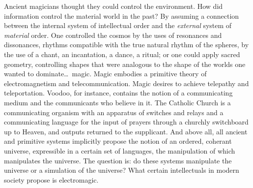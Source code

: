 Ancient magicians thought they could control the environment. How did information control the
material world in the past? By assuming a connection between the internal system of intellectual
order and the \emph{external} system of \emph{material} order. One controlled the cosmos by the uses
of resonances and dissonances, rhythms compatible with the true natural rhythm of the spheres, by
the use of a chant, an incantation, a dance, a ritual; or one could apply sacred geometry,
controlling shapes that were analogous to the shape of the worlds one wanted to dominate\ldots\
magic. Magic embodies a primitive theory of electromagnetism and telecommunication. Magic desires to
achieve telepathy and teleportation. Voodoo, for instance, contains the notion of a communicating
medium and the communicants who believe in it. The Catholic Church is a communicating organism with
an apparatus of switches and relays and a communicating language for the input of prayers through a
churchly switchboard up to Heaven, and outputs returned to the supplicant. And above all, all
ancient and primitive systems implicitly propose the notion of an ordered, coherant universe,
expressible in a certain set of languages, the manipulation of which manipulates the universe. The
question is: do these systems manipulate the universe or a simulation of the universe? What certain
intellectuals in modern society propose is electromagic. 

